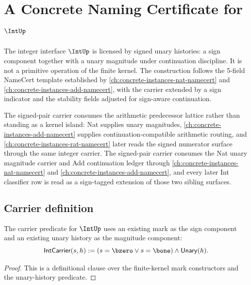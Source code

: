 \chapter{A Concrete Naming Certificate for \(\IntUp\)}
\label{ch:concrete-instances-int-namecert}

The integer interface \(\IntUp\) is licensed by signed unary histories: a sign component together with a unary magnitude under continuation discipline. It is not a primitive operation of the finite kernel. The construction follows the 5-field NameCert template established by \autoref{ch:concrete-instances-nat-namecert} and \autoref{ch:concrete-instances-add-namecert}, with the carrier extended by a sign indicator and the stability fields adjusted for sign-aware continuation.

The signed-pair carrier consumes the arithmetic predecessor lattice rather than standing as a kernel island: Nat supplies unary magnitudes, \autoref{ch:concrete-instances-add-namecert} supplies continuation-compatible arithmetic routing, and \autoref{ch:concrete-instances-rat-namecert} later reads the signed numerator surface through the same integer carrier.
The signed-pair carrier consumes the Nat unary magnitude carrier and Add continuation ledger through \autoref{ch:concrete-instances-nat-namecert} and \autoref{ch:concrete-instances-add-namecert}, and every later Int classifier row is read as a sign-tagged extension of those two sibling surfaces.

\section{Carrier definition}

\begin{definition}
\label{def:intup-carrier}
The carrier predicate for \(\IntUp\) uses an existing mark as the sign component and an existing unary history as the magnitude component:
$$
  \mathsf{IntCarrier}(s,h)
  :=
  (s=\bzero \lor s=\bone)\land \mathsf{Unary}(h).
$$
\end{definition}
\begin{proof}
This is a definitional clause over the finite-kernel mark constructors and the unary-history predicate.
\end{proof}

